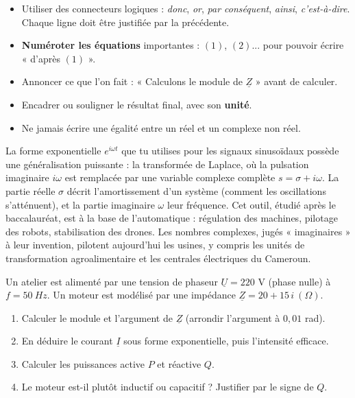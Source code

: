 \documentclass[11pt]{article}
\newcommand{\cle}[1]{{\popxbold\color{popdark}#1}}
\begin{document}
\begin{attention}
\begin{itemize}
\item Utiliser des \cle{connecteurs logiques} : \emph{donc}, \emph{or}, \emph{par conséquent}, \emph{ainsi}, \emph{c'est-à-dire}. Chaque ligne doit être justifiée par la précédente.
\item \textbf{Numéroter les équations} importantes : $(1)$, $(2)$... pour pouvoir écrire « d'après $(1)$ ».
\item Annoncer ce que l'on fait : « Calculons le module de $\underline{Z}$ » avant de calculer.
\item Encadrer ou souligner le résultat final, avec son \textbf{unité}.
\item Ne jamais écrire une égalité entre un réel et un complexe non réel.
\end{itemize}
\end{attention}

\begin{savaistu}
La forme exponentielle $e^{i\omega t}$ que tu utilises pour les signaux sinusoïdaux possède une généralisation puissante : la \cle{transformée de Laplace}, où la pulsation imaginaire $i\omega$ est remplacée par une variable complexe complète $s = \sigma + i\omega$. La partie réelle $\sigma$ décrit l'amortissement d'un système (comment les oscillations s'atténuent), et la partie imaginaire $\omega$ leur fréquence. Cet outil, étudié après le baccalauréat, est à la base de l'automatique : régulation des machines, pilotage des robots, stabilisation des drones. Les nombres complexes, jugés « imaginaires » à leur invention, pilotent aujourd'hui les usines, y compris les unités de transformation agroalimentaire et les centrales électriques du Cameroun.
\end{savaistu}

\begin{exercice}
Un atelier est alimenté par une tension de phaseur $\underline{U} = 220$ V (phase nulle) à $f = \SI{50}{Hz}$. Un moteur est modélisé par une impédance $\underline{Z} = 20 + 15\,i\ (\Omega)$.
\begin{enumerate}
\item Calculer le module et l'argument de $\underline{Z}$ (arrondir l'argument à $0{,}01$ rad).
\item En déduire le courant $\underline{I}$ sous forme exponentielle, puis l'intensité efficace.
\item Calculer les puissances active $P$ et réactive $Q$.
\item Le moteur est-il plutôt inductif ou capacitif ? Justifier par le signe de $Q$.
\end{enumerate}
\end{exercice}
\end{document}
